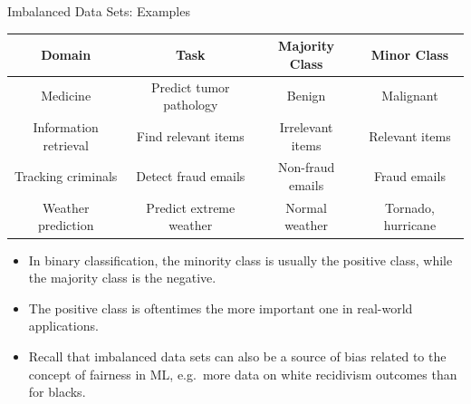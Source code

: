 \documentclass[11pt,compress,t,notes=noshow, xcolor=table]{beamer}
\begin{document}
\begin{vbframe}{Imbalanced Data Sets: Examples}
    \small
    \begin{table}[h]
        \scriptsize
        \centering
        \begin{tabular}{cccc}
            \toprule
            \textbf{Domain} & \textbf{Task} & \textbf{Majority Class} & \textbf{Minor Class} \\ [5pt]
            \hline
            Medicine & Predict tumor pathology & Benign &  Malignant \\ [5pt]
            Information retrieval & Find relevant items & Irrelevant items & Relevant items \\ [5pt]
            Tracking criminals & Detect fraud emails & Non-fraud emails & Fraud emails \\ [5pt]
            Weather prediction & Predict extreme weather & Normal weather & Tornado, hurricane \\
            \hline
        \end{tabular}
    \end{table}
    
	\begin{itemize}
        \item In binary classification, the minority class is usually the positive class, while the majority class is the negative. 
        \item The positive class is oftentimes the more important one in real-world applications.
        \item Recall that imbalanced data sets can also be a source of bias related to the concept of fairness in ML, e.g.\ more data on white recidivism outcomes than for blacks.
	\end{itemize}

\end{vbframe}
\end{document}
